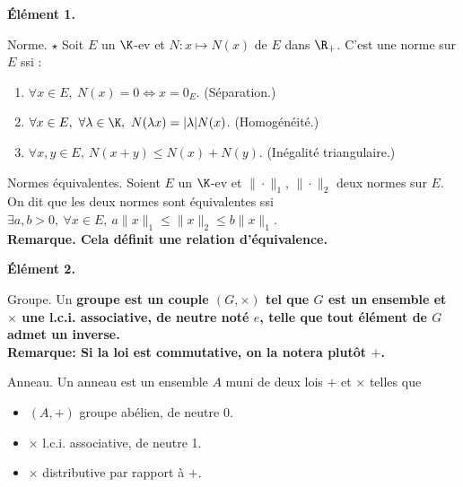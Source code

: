 \documentclass[11pt]{article}
\begin{document}


\thispagestyle{fancy}

\bf{Élément 1.}

\begin{defi}{Norme. $\star$}{}
    Soit $E$ un $\K$-ev et $N:x\mapsto N(x)$ de $E$ dans $\R_+$. C'est une norme sur $E$ ssi :
    \begin{enumerate}
        \item $\forall x \in E, ~ N(x)=0 \iff x = 0_E$. (Séparation.)
        \item $\forall x \in E, ~ \forall \lambda \in \K, ~ N(\lambda x) = |\lambda|N(x)$. (Homogénéité.)
        \item $\forall x,y \in E, ~ N(x+y) \leq N(x) + N(y)$. (Inégalité triangulaire.)
    \end{enumerate}
\end{defi}

\begin{defi}{Normes équivalentes.}{}
    Soient $E$ un $\K$-ev et $\|\cdot\|_1$, $\|\cdot\|_2$ deux normes sur $E$.\\
    On dit que les deux normes sont équivalentes ssi $\exists a,b > 0, ~ \forall x \in E, ~ a\|x\|_1\leq\|x\|_2\leq b\|x\|_1$.\\
    \bf{Remarque.} Cela définit une relation d'équivalence.
\end{defi}

\bf{Élément 2.}

\begin{defi}{Groupe.}{}
    Un \bf{groupe} est un couple $(G,\times)$ tel que $G$ est un ensemble et $\times$ une l.c.i. associative, de neutre noté $e$, telle que tout élément de $G$ admet un inverse.\\
    \bf{Remarque:} Si la loi est commutative, on la notera plutôt $+$.
\end{defi}

\begin{defi}{Anneau.}{}
    Un anneau est un ensemble $A$ muni de deux lois $+$ et $\times$ telles que
    \begin{itemize}
        \item $(A,+)$ groupe abélien, de neutre $0$.
        \item $\times$ l.c.i. associative, de neutre 1.
        \item $\times$ distributive par rapport à $+$.
    \end{itemize}
\end{defi}
\end{document}
